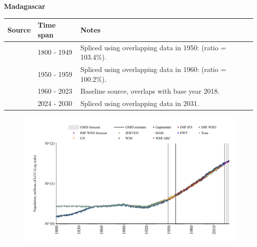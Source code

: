 \documentclass[12pt,a4paper,landscape]{article}
\begin{document}
\begin{adjustbox}{max totalsize={\paperwidth}{\paperheight},center}
\begin{minipage}[t][\textheight][t]{\textwidth}
\vspace*{0.5cm}
{}
\begin{center}
{\Large\bfseries Madagascar}
\end{center}
\vspace{0.5cm}
\begin{table}[H]
\centering
\small
\begin{tabular}{|l|l|l|}
\hline
\textbf{Source} & \textbf{Time span} & \textbf{Notes} \\
\hline
\rowcolor{white}\cite{Gapminder}& 1800 - 1949 &Spliced using overlapping data in 1950: (ratio = 103.4\%).\\
\rowcolor{lightgray}\cite{IMF_IFS}& 1950 - 1959 &Spliced using overlapping data in 1960: (ratio = 100.2\%).\\
\rowcolor{white}\cite{WDI}& 1960 - 2023 &Baseline source, overlaps with base year 2018.\\
\rowcolor{lightgray}\cite{Gapminder}& 2024 - 2030 &Spliced using overlapping data in 2031.\\
\hline
\end{tabular}
\end{table}
\begin{figure}[H]
\centering
\includegraphics[width=\textwidth,height=0.6\textheight,keepaspectratio]{graphs/MDG_pop.pdf}
\end{figure}
\end{minipage}
\end{adjustbox}
\end{document}
